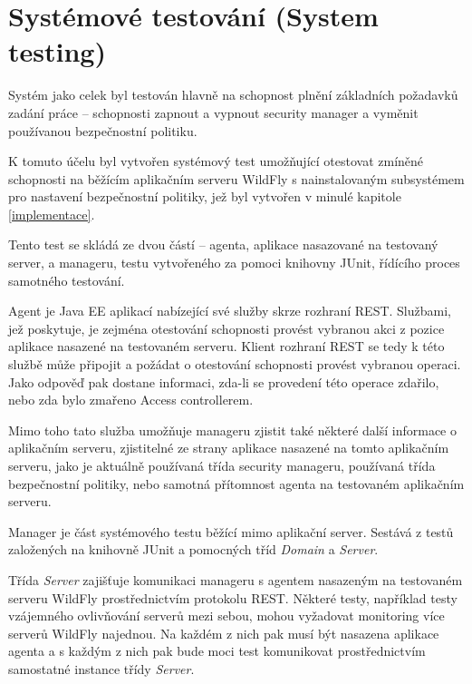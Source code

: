 \section{Systémové testování (System testing)}

Systém jako celek byl testován hlavně na schopnost plnění základních požadavků zadání práce -- schopnosti zapnout a vypnout security manager a vyměnit používanou bezpečnostní politiku.

K tomuto účelu byl vytvořen systémový test umožňující otestovat zmíněné schopnosti na běžícím aplikačním serveru WildFly s nainstalovaným subsystémem pro nastavení bezpečnostní politiky, jež byl vytvořen v minulé kapitole \ref{implementace}.

Tento test se skládá ze dvou částí -- agenta, aplikace nasazované na testovaný server, a manageru, testu vytvořeného za pomoci knihovny JUnit, řídícího proces samotného testování.

Agent je Java EE aplikací nabízející své služby skrze rozhraní REST. Službami, jež poskytuje, je zejména otestování schopnosti provést vybranou akci z pozice aplikace nasazené na testovaném serveru. Klient rozhraní REST se tedy k této službě může připojit a požádat o otestování schopnosti provést vybranou operaci. Jako odpověď pak dostane informaci, zda-li se provedení této operace zdařilo, nebo zda bylo zmařeno Access controllerem.

Mimo toho tato služba umožňuje manageru zjistit také některé další informace o aplikačním serveru, zjistitelné ze strany aplikace nasazené na tomto aplikačním serveru, jako je aktuálně používaná třída security manageru, používaná třída bezpečnostní politiky, nebo samotná přítomnost agenta na testovaném aplikačním serveru.

Manager je část systémového testu běžící mimo aplikační server. Sestává z testů založených na knihovně JUnit a pomocných tříd {\it Domain} a {\it Server}.

Třída {\it Server} zajišťuje komunikaci manageru s agentem nasazeným na testovaném serveru WildFly prostřednictvím protokolu REST. Některé testy, například testy vzájemného ovlivňování serverů mezi sebou, mohou vyžadovat monitoring více serverů WildFly najednou. Na každém z nich pak musí být nasazena aplikace agenta a s každým z nich pak bude moci test komunikovat prostřednictvím samostatné instance třídy {\it Server}.

